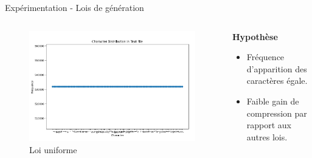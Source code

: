 \documentclass{beamer}
\begin{document}
\begin{frame}{Expérimentation - Lois de génération}
    \begin{columns}[T]
        \begin{column}{0.6\textwidth}
            \begin{figure}
                \centering
                \includegraphics[width=\textwidth]{../assets/uniform.png}
                \caption{Loi uniforme}
            \end{figure}
        \end{column}
        \begin{column}{0.5\textwidth}
            \vspace{10pt}
            \textbf{Hypothèse} \\
            \vspace{10pt}
            \begin{itemize}
                \item Fréquence d'apparition des caractères égale.
                \item Faible gain de compression par rapport aux autres lois.
            \end{itemize}
        \end{column}
    \end{columns}
\end{frame}
\end{document}
